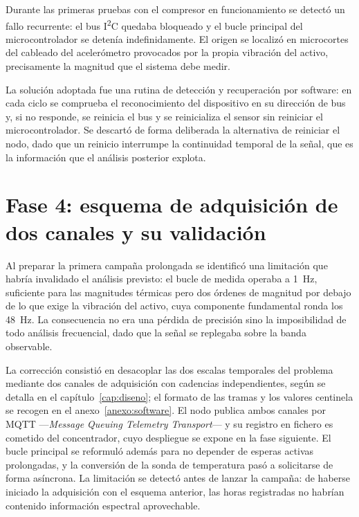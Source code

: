 Durante las primeras pruebas con el compresor en funcionamiento se detectó un fallo
recurrente: el bus I\textsuperscript{2}C quedaba bloqueado y el bucle principal del
microcontrolador se detenía indefinidamente. El origen se localizó en microcortes del
cableado del acelerómetro provocados por la propia vibración del activo, precisamente la
magnitud que el sistema debe medir.

La solución adoptada fue una rutina de detección y recuperación por software: en cada ciclo
se comprueba el reconocimiento del dispositivo en su dirección de bus y, si no responde, se
reinicia el bus y se reinicializa el sensor sin reiniciar el microcontrolador. Se descartó
de forma deliberada la alternativa de reiniciar el nodo, dado que un reinicio interrumpe la
continuidad temporal de la señal, que es la información que el análisis posterior explota.

\section{Fase 4: esquema de adquisición de dos canales y su validación}

Al preparar la primera campaña prolongada se identificó una limitación que habría invalidado el
análisis previsto: el bucle de medida operaba a \mbox{1 Hz}, suficiente para las magnitudes
térmicas pero dos órdenes de magnitud por debajo de lo que exige la vibración del activo, cuya
componente fundamental ronda los \mbox{48 Hz}. La consecuencia no era una pérdida de precisión
sino la imposibilidad de todo análisis frecuencial, dado que la señal se replegaba sobre la banda
observable.

La corrección consistió en desacoplar las dos escalas temporales del problema mediante dos
canales de adquisición con cadencias independientes, según se detalla en el
capítulo~\ref{cap:diseno}; el formato de las tramas y los valores centinela se recogen en el
anexo~\ref{anexo:software}. El nodo publica ambos canales por MQTT —\textit{Message Queuing
Telemetry Transport}— y su registro en fichero es
cometido del concentrador, cuyo despliegue se expone en la fase siguiente. El bucle
principal se reformuló además para no depender de esperas activas prolongadas, y la conversión de
la sonda de temperatura pasó a solicitarse de forma asíncrona. La limitación se detectó antes de
lanzar la campaña: de haberse iniciado la adquisición con el esquema anterior, las horas
registradas no habrían contenido información espectral aprovechable.


